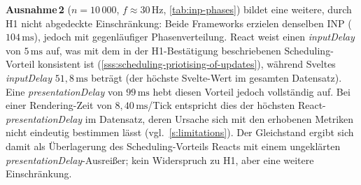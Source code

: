 \noindent\textbf{Ausnahme\,2} ($n = 10\,000$, $f \approx 30\,\text{Hz}$, \cref{tab:inp-phases}) bildet eine weitere, durch H1 nicht abgedeckte Einschränkung: Beide Frameworks erzielen denselben INP ($104\,\text{ms}$), jedoch mit gegenläufiger Phasenverteilung. React weist einen \textit{inputDelay} von $5\,\text{ms}$ auf, was mit dem in der H1-Bestätigung beschriebenen Scheduling-Vorteil konsistent ist (\cref{sss:scheduling-priotising-of-updates}), während Sveltes \textit{inputDelay} $51{,}8\,\text{ms}$ beträgt (der höchste Svelte-Wert im gesamten Datensatz). Eine \textit{presentationDelay} von $99\,\text{ms}$ hebt diesen Vorteil jedoch vollständig auf. Bei einer Rendering-Zeit von $8{,}40\,\text{ms}$/Tick entspricht dies der höchsten React-\textit{presentationDelay} im Datensatz, deren Ursache sich mit den erhobenen Metriken nicht eindeutig bestimmen lässt (vgl.~\cref{s:limitations}). Der Gleichstand ergibt sich damit als Überlagerung des Scheduling-Vorteils Reacts mit einem ungeklärten \textit{presentationDelay}-Ausreißer; kein Widerspruch zu H1, aber eine weitere Einschränkung.
